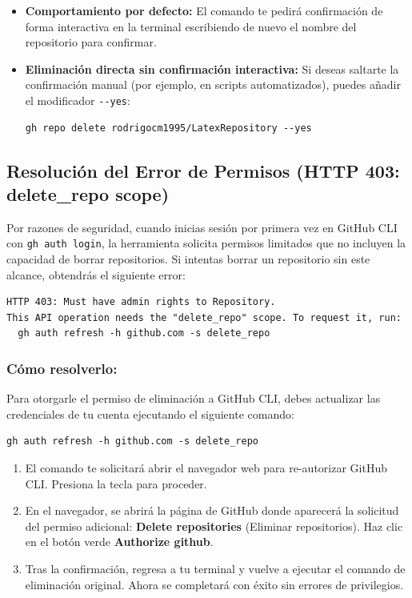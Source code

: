 \documentclass[
10pt, %
a4paper, %
oneside, %
headinclude,footinclude, %
BCOR5mm, %
]{scrartcl}
\begin{document}
\begin{itemize}
	\item \textbf{Comportamiento por defecto:} El comando te pedirá confirmación de forma interactiva en la terminal escribiendo de nuevo el nombre del repositorio para confirmar.
	\item \textbf{Eliminación directa sin confirmación interactiva:} Si deseas saltarte la confirmación manual (por ejemplo, en scripts automatizados), puedes añadir el modificador \texttt{-{}-yes}:
	\begin{lstlisting}[language=DOS]
	gh repo delete rodrigocm1995/LatexRepository --yes
	\end{lstlisting}
\end{itemize}

\subsection{Resolución del Error de Permisos (HTTP 403: delete\_repo scope)}
Por razones de seguridad, cuando inicias sesión por primera vez en GitHub CLI con \texttt{gh auth login}, la herramienta solicita permisos limitados que no incluyen la capacidad de borrar repositorios. Si intentas borrar un repositorio sin este alcance, obtendrás el siguiente error:
\begin{lstlisting}[language=plaintext, style=miestiloclaro]
HTTP 403: Must have admin rights to Repository.
This API operation needs the "delete_repo" scope. To request it, run:
  gh auth refresh -h github.com -s delete_repo
\end{lstlisting}

\subsubsection{Cómo resolverlo:}
Para otorgarle el permiso de eliminación a GitHub CLI, debes actualizar las credenciales de tu cuenta ejecutando el siguiente comando:
\begin{lstlisting}[language=DOS]
gh auth refresh -h github.com -s delete_repo
\end{lstlisting}

\begin{enumerate}
	\item El comando te solicitará abrir el navegador web para re-autorizar GitHub CLI. Presiona la tecla  para proceder.
	\item En el navegador, se abrirá la página de GitHub donde aparecerá la solicitud del permiso adicional: \textbf{Delete repositories} (Eliminar repositorios). Haz clic en el botón verde \textbf{Authorize github}.
	\item Tras la confirmación, regresa a tu terminal y vuelve a ejecutar el comando de eliminación original. Ahora se completará con éxito sin errores de privilegios.
\end{enumerate}
\end{document}

